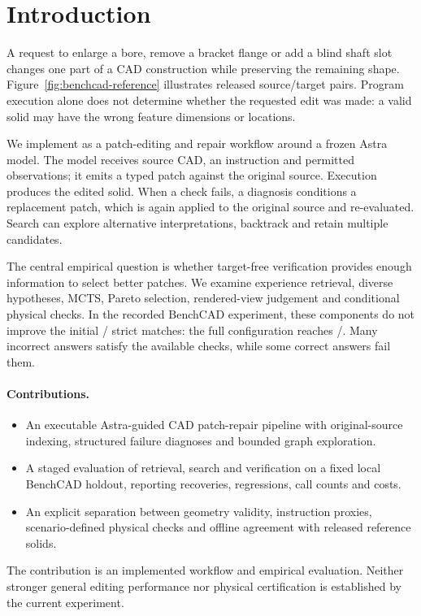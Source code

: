 \section{Introduction}
\label{sec:intro}
A request to enlarge a bore, remove a bracket flange or add a blind shaft slot changes one part of a CAD construction while preserving the remaining shape. Figure~\ref{fig:benchcad-reference} illustrates released source/target pairs. Program execution alone does not determine whether the requested edit was made: a valid solid may have the wrong feature dimensions or locations.

We implement \ours as a patch-editing and repair workflow around a frozen Astra model. The model receives source CAD, an instruction and permitted observations; it emits a typed patch against the original source. Execution produces the edited solid. When a check fails, a diagnosis conditions a replacement patch, which is again applied to the original source and re-evaluated. Search can explore alternative interpretations, backtrack and retain multiple candidates.

The central empirical question is whether target-free verification provides enough information to select better patches. We examine experience retrieval, diverse hypotheses, MCTS, Pareto selection, rendered-view judgement and conditional physical checks. In the recorded BenchCAD experiment, these components do not improve the initial \pipeAstra/\pipeN{} strict matches: the full configuration reaches \pipeFull/\pipeN{}. Many incorrect answers satisfy the available checks, while some correct answers fail them.

\paragraph{Contributions.}
\begin{itemize}
\item An executable Astra-guided CAD patch-repair pipeline with original-source indexing, structured failure diagnoses and bounded graph exploration.
\item A staged evaluation of retrieval, search and verification on a fixed local BenchCAD holdout, reporting recoveries, regressions, call counts and costs.
\item An explicit separation between geometry validity, instruction proxies, scenario-defined physical checks and offline agreement with released reference solids.
\end{itemize}
The contribution is an implemented workflow and empirical evaluation. Neither stronger general editing performance nor physical certification is established by the current experiment.
